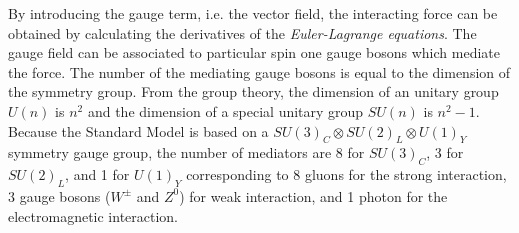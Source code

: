 %
By introducing the gauge term, i.e. the vector field, the interacting force can be obtained by calculating the derivatives of the \textit{Euler-Lagrange equations}.
The gauge field can be associated to particular spin one gauge bosons which mediate the force.
The number of the mediating gauge bosons is equal to the dimension of the symmetry group.
From the group theory, the dimension of an unitary group $U(n)$ is $n^{2}$ and the dimension of a special unitary group $SU(n)$ is $n^{2} - 1$.
Because the Standard Model is based on a $SU(3)_{C} \otimes SU(2)_{L} \otimes U(1)_{Y}$ symmetry gauge group, the number of mediators are 8 for $SU(3)_{C}$, 3 for $SU(2)_{L}$, and 1 for $U(1)_{Y}$ corresponding to 8 gluons for the strong interaction, 3 gauge bosons ($W^{\pm}$ and $Z^{0}$) for weak interaction, and 1 photon for the electromagnetic interaction.



